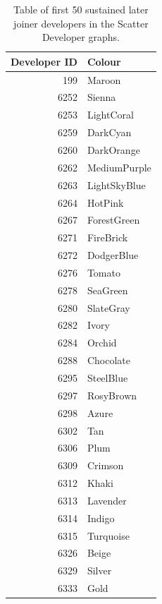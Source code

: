 \begin{table}[H]
\centering
\caption{Table of first 50 sustained later joiner developers in the Scatter Developer graphs. } 
\label{tab:21first_developerssustained_later_joiner}
\begin{tabular}{rl}
\toprule
\textbf{Developer ID} & \textbf{Colour} \\ 
\midrule
199 & \color{Maroon}Maroon \\ 
6252 & \color{Sienna}Sienna \\ 
6253 & \color{LightCoral}LightCoral \\ 
6259 & \color{DarkCyan}DarkCyan \\ 
6260 & \color{DarkOrange}DarkOrange \\ 
6262 & \color{MediumPurple}MediumPurple \\ 
6263 & \color{LightSkyBlue}LightSkyBlue \\ 
6264 & \color{HotPink}HotPink \\ 
6267 & \color{ForestGreen}ForestGreen \\ 
6271 & \color{FireBrick}FireBrick \\ 
6272 & \color{DodgerBlue}DodgerBlue \\ 
6276 & \color{Tomato}Tomato \\ 
6278 & \color{SeaGreen}SeaGreen \\ 
6280 & \color{SlateGray}SlateGray \\ 
6282 & \color{Ivory}Ivory \\ 
6284 & \color{Orchid}Orchid \\ 
6288 & \color{Chocolate}Chocolate \\ 
6295 & \color{SteelBlue}SteelBlue \\ 
6297 & \color{RosyBrown}RosyBrown \\ 
6298 & \color{Azure}Azure \\ 
6302 & \color{Tan}Tan \\ 
6306 & \color{Plum}Plum \\ 
6309 & \color{Crimson}Crimson \\ 
6312 & \color{Khaki}Khaki \\ 
6313 & \color{Lavender}Lavender \\ 
6314 & \color{Indigo}Indigo \\ 
6315 & \color{Turquoise}Turquoise \\ 
6326 & \color{Beige}Beige \\ 
6329 & \color{Silver}Silver \\ 
6333 & \color{Gold}Gold \\ 

\end{tabular}
\end{table}
